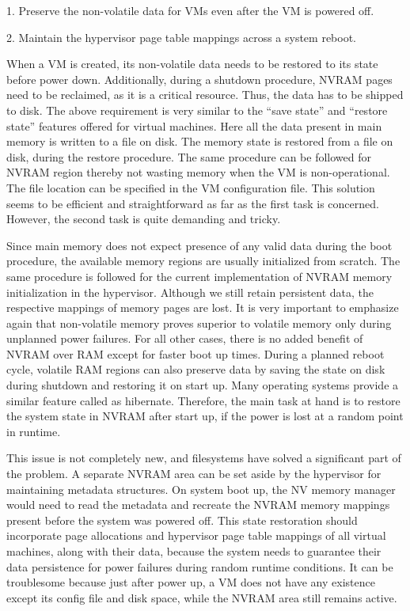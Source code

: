 1. Preserve the non-volatile data for VMs even after the VM is powered off.

2. Maintain the hypervisor page table mappings across a system reboot.

When a VM is created, its non-volatile data needs to be restored to its state before power down. Additionally, during a shutdown procedure, NVRAM pages need to be reclaimed, as it is a critical resource. Thus, the data has to be shipped to disk. The above requirement is very similar to the “save state” and “restore state” features offered for virtual machines. Here all the data present in main memory is written to a file on disk. The memory state is restored from a file on disk, during the restore procedure. The same procedure can be followed for NVRAM region thereby not wasting memory when the VM is non-operational. The file location can be specified in the VM configuration file. This solution seems to be efficient and straightforward as far as the first task is concerned. However, the second task is quite demanding and tricky.

Since main memory does not expect presence of any valid data during the boot procedure, the available memory regions are usually initialized from scratch. The same procedure is followed for the current implementation of NVRAM memory initialization in the hypervisor. Although we still retain persistent data, the respective mappings of memory pages are lost. It is very important to emphasize again that non-volatile memory proves superior to volatile memory only during unplanned power failures. For all other cases, there is no added benefit of NVRAM over RAM except for faster boot up times. During a planned reboot cycle, volatile RAM regions can also preserve data by saving the state on disk during shutdown and restoring it on start up. Many operating systems provide a similar feature called as hibernate. Therefore, the main task at hand is to restore the system state in NVRAM after start up, if the power is lost at a random point in runtime.

This issue is not completely new, and filesystems have solved a significant part of the problem. A separate NVRAM area can be set aside by the hypervisor for maintaining metadata structures. On system boot up, the NV memory manager would need to read the metadata and recreate the NVRAM memory mappings present before the system was powered off. This state restoration should incorporate page allocations and hypervisor page table mappings of all virtual machines, along with their data, because the system needs to guarantee their data persistence for power failures during random runtime conditions. It can be troublesome because just after power up, a VM does not have any existence except its config file and disk space, while the NVRAM area still remains active.

